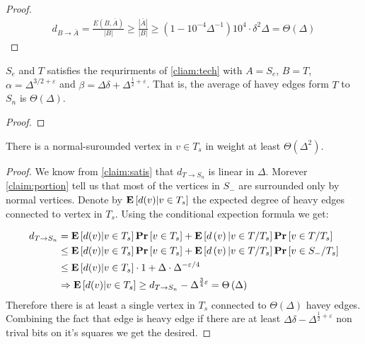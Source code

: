\begin{proof}
   \begin{equation*}
     \begin{split}
       d_{B\rightarrow \bar{A}} = \frac{ E\left(B,\bar{A}\right) }{|B|} \ge \frac{|\bar{A}|}{|B|} \ge \left( 1 - 10^{-4}\Delta^{-1}  \right) 10^{4} \cdot \delta^{2}\Delta  = \Theta\left( \Delta \right)
     \end{split}
   \end{equation*}
 \end{proof}
 
 \begin{claim}
   \label{claim:satis}
   $S_{e}$ and $T$ satisfies the requrirments of \cref{cliam:tech} with $A = S_{e}$, $B = T$, $\alpha = \Delta^{3/2 + \varepsilon}$ and $\beta = \Delta\delta + \Delta^{\frac{1}{2} + \varepsilon}$. That is, the average of havey edges form $T$ to $S_{n}$ is $\Theta\left( \Delta \right)$. 
 \end{claim}

 \begin{proof}
 \end{proof}

\begin{claim}
  \label{claim:linear}
  There is a normal-surounded vertex in $v \in T_{s}$ in weight at least $\Theta\left(\Delta^{2}\right)$.   
 \end{claim}
 \begin{proof}
   We know from \cref{claim:satis} that $d_{T\rightarrow S_{n} }$ is linear in $\Delta$. Morever \cref{claim:portion} tell us that most of the vertices in $S_{-}$ are surrounded only by normal vertices. Denote by $\mathbf{E} \left[ { d(v) | v \in T_{s} } \right]$ the expected degree of heavy edges connected to vertex in $T_{s}$. Using the conditional expection formula we get:
  
   \begin{equation*}
     \begin{split}
       d_{T \rightarrow S_{n}} &= \mathbf{E} \left[ { d(v) | v \in T_{s} } \right] \mathbf{Pr} \left[  v \in T_{s} \right] + \mathbf{E} \left[ {d\left( v \right) | v \in T / T_{s}} \right] \mathbf{Pr} \left[  v \in T / T_{s} \right] \\
       & \le \mathbf{E} \left[ { d(v) | v \in T_{s} } \right] \mathbf{Pr} \left[  v \in T_{s} \right] + \mathbf{E} \left[ {d\left( v \right) | v \in T / T_{s}} \right] \mathbf{Pr} \left[  v \in S_{-} / T_{s} \right] \\
       & \le \mathbf{E} \left[ { d(v) | v \in T_{s} } \right] \cdot 1   + \Delta \cdot  \Delta^{-\varepsilon/4} \\
       & \Rightarrow  \mathbf{E} \left[ { d(v) | v \in T_{s} } \right] \ge d_{T \rightarrow S_{n}} - \Delta^{\frac{3}{4} \varepsilon} = \Theta\left( \Delta \right) 
     \end{split}
   \end{equation*}
   Therefore there is at least a single vertex in $T_{s}$ connected to $\Theta\left( \Delta \right)$ havey edges. Combining the fact that edge is heavy edge if there are at least $\Delta\delta - \Delta^{\frac{1}{2} + \varepsilon}$ non trival bits on it's squares we get the desired.  
 \end{proof}

